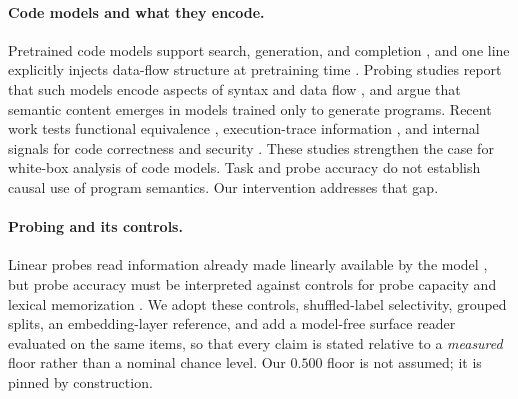 \documentclass[10pt]{article}
\begin{document}
\paragraph{Code models and what they encode.} Pretrained code models support
search, generation, and completion \citep{feng2020codebert,wang2021codet5,
chen2021codex,nijkamp2023codegen,li2023starcoder,lozhkov2024starcoder2,
guo2024deepseekcoder}, and one line explicitly injects data-flow structure at
pretraining time \citep{guo2021graphcodebert}. Probing studies report that such
models encode aspects of syntax and data flow
\citep{karmakar2021whatdo,wan2022theyknow,troshin2022probing,lopez2022astprobe},
and \citet{jin2023evidence} argue that semantic content emerges in models trained
only to generate programs. Recent work tests functional equivalence
\citep{maveli2025functional}, execution-trace information
\citep{wang2025codesemantics}, and internal signals for code correctness and
security \citep{tahimic2025correctness,vu2025autoprobe}. These studies strengthen
the case for white-box analysis of code models. Task and probe accuracy do not
establish causal use of program semantics. Our intervention addresses that gap.

\paragraph{Probing and its controls.} Linear probes read information already made
linearly available by the model \citep{alain2016understanding}, but probe
accuracy must be interpreted against controls for probe capacity and lexical
memorization \citep{hewitt2019control,pimentel2020information,voita2020information,
belinkov2022probing}. We adopt these controls, shuffled-label selectivity,
grouped splits, an embedding-layer reference, and add a model-free surface reader
evaluated on the same items, so that every claim is stated relative to a
\emph{measured} floor rather than a nominal chance level. Our
$0.500$ floor is not assumed; it is pinned by construction.
\end{document}

